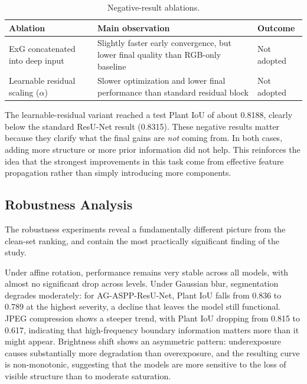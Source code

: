 \documentclass[conference]{IEEEtran}
\begin{document}
\begin{table}[t]
\centering
\caption{Negative-result ablations.}\label{tab:ablation}
\renewcommand{\arraystretch}{1.1}
\begin{tabular}{@{}>{\raggedright\arraybackslash}p{1.9cm}>{\raggedright\arraybackslash}p{3.0cm}l@{}}
\toprule
\textbf{Ablation} & \textbf{Main observation} & \textbf{Outcome} \\
\midrule
ExG concatenated into deep input &
  Slightly faster early convergence, but lower final quality than
  RGB-only baseline & Not adopted \\
\addlinespace
Learnable residual scaling ($\alpha$) &
  Slower optimization and lower final performance than standard
  residual block & Not adopted \\
\bottomrule
\end{tabular}
\end{table}

The learnable-residual variant reached a test Plant IoU of
about 0.8188, clearly below the standard ResU-Net result (0.8315).
These negative results matter because they clarify what the final gains
are \emph{not} coming from. In both cases, adding more structure or
more prior information did not help. This reinforces the idea that the
strongest improvements in this task come from effective feature
propagation rather than simply introducing more components.

\subsection{Robustness Analysis}

The robustness experiments reveal a fundamentally different picture from
the clean-set ranking, and contain the most practically significant
finding of the study.

Under affine rotation, performance remains very stable across all
models, with almost no significant drop across levels. Under Gaussian
blur, segmentation degrades moderately: for AG-ASPP-ResU-Net, Plant IoU
falls from 0.836 to 0.789 at the highest severity, a decline that
leaves the model still functional. JPEG compression shows a steeper
trend, with Plant IoU dropping from 0.815 to 0.617, indicating that
high-frequency boundary information matters more than it might appear.
Brightness shift shows an asymmetric pattern: underexposure causes
substantially more degradation than overexposure, and the resulting
curve is non-monotonic, suggesting that the models are more sensitive to
the loss of visible structure than to moderate saturation.
\end{document}
